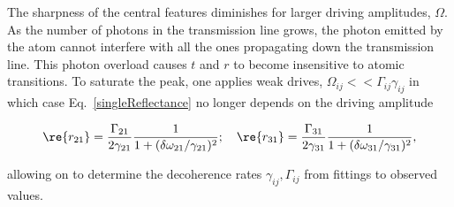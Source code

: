 The sharpness of the central features diminishes for larger driving amplitudes, $ \Omega $. As the number of photons in the transmission line grows, the photon emitted by the atom cannot interfere with all the ones propagating down the transmission line. This photon overload causes $ t $ and $ r $ to become insensitive to atomic transitions.  To saturate the peak, one applies weak drives, $ \Omega_{ij}<<\Gamma_{ij}\gamma_{ij} $ in which case Eq.~\eqref{singleReflectance} no longer depends on the driving amplitude

\begin{equation}
\begin{aligned}
\re{r_{21}} = \frac{\Gamma_{21}}{2\gamma_{21}}\frac{1}{1+(\delta\omega_{21}/\gamma_{21})^2}; \quad \re{r_{31}}=\frac{\Gamma_{31}}{2\gamma_{31}}\frac{1}{1+(\delta\omega_{31}/\gamma_{31})^2},
\end{aligned}
\label{singleLorentzian}
\end{equation}

\noindent allowing on to determine the decoherence rates  $ \gamma_{ij}, \Gamma_{ij} $ from fittings to observed values.


